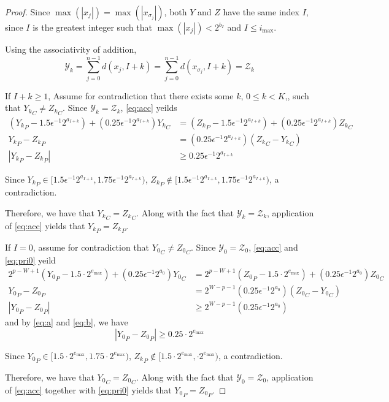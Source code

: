       \begin{proof}
        Since $\max(|x_j|) = \max(|x_{\sigma_j}|)$, both $Y$ and $Z$ have the same index $I$, since $I$ is the greatest integer such that $\max(|x_j|) < 2^{b_I}$ and $I \leq i_{\max}$.

        Using the associativity of addition,
        \begin{equation*}
          \mathcal{Y}_k = \sum\limits_{j = 0}^{n - 1}d(x_j, I + k) = \sum\limits_{j = 0}^{n - 1}d(x_{\sigma_j}, I + k) = \mathcal{Z}_k
        \end{equation*}

        If $I + k \geq 1$, Assume for contradiction that there exists some $k$, $0 \leq k < K$,, such that ${Y_k}_C \neq {Z_k}_C$. Since $\mathcal{Y}_k = \mathcal{Z}_k$, \eqref{eq:acc} yeilds
        \begin{align*}
          ({Y_k}_P - 1.5 \epsilon^{-1}2^{a_{I + k}}) + (0.25\epsilon^{-1}2^{a_{I + k}}){Y_k}_C &= ({Z_k}_P - 1.5 \epsilon^{-1}2^{a_{I + k}}) + (0.25\epsilon^{-1}2^{a_{I + k}}){Z_k}_C\\
          {Y_k}_P - {Z_k}_P &= (0.25\epsilon^{-1}2^{a_{I + k}})({Z_k}_C - {Y_k}_C)\\
          |{Y_k}_P - {Z_k}_P| &\geq 0.25\epsilon^{-1}2^{a_{I + k}}
        \end{align*}

        Since ${Y_k}_P \in [1.5  \epsilon^{-1} 2^{a_{I + k}}, 1.75  \epsilon^{-1} 2^{a_{I + k}})$, ${Z_k}_P \not\in [1.5  \epsilon^{-1} 2^{a_{I + k}}, 1.75  \epsilon^{-1} 2^{a_{I + k}})$, a contradiction.

        Therefore, we have that ${Y_k}_C = {Z_k}_C$. Along with the fact that $\mathcal{Y}_k = \mathcal{Z}_k$, application of \eqref{eq:acc} yields that ${Y_k}_P = {Z_k}_P$.

        If $I = 0$, assume for contradiction that ${Y_0}_C \neq {Z_0}_C$. Since $\mathcal{Y}_0 = \mathcal{Z}_0$, \eqref{eq:acc} and \eqref{eq:pri0} yeild
        \begin{align*}
          2^{p - W + 1}({Y_0}_P - 1.5\cdot2^{e_{\max}}) + (0.25\epsilon^{-1}2^{a_{0}}){Y_0}_C &= 2^{p - W + 1}({Z_0}_P - 1.5\cdot2^{e_{\max}}) + (0.25\epsilon^{-1}2^{a_{0}}){Z_0}_C\\
          {Y_0}_P - {Z_0}_P &= 2^{W - p - 1}(0.25\epsilon^{-1}2^{a_{0}})({Z_0}_C - {Y_0}_C)\\
          |{Y_0}_P - {Z_0}_P| &\geq 2^{W - p - 1}(0.25\epsilon^{-1}2^{a_{0}})
        \end{align*}
        and by \eqref{eq:a} and \eqref{eq:b}, we have
        \begin{equation*}
          |{Y_0}_P - {Z_0}_P| \geq 0.25\cdot2^{e_{\max}}
        \end{equation*}

        Since ${Y_0}_P \in [1.5  \cdot2^{e_{\max}}, 1.75  \cdot2^{e_{\max}})$, ${Z_k}_P \not\in [1.5  \cdot2^{e_{\max}}, \cdot2^{e_{\max}})$, a contradiction.

        Therefore, we have that ${Y_0}_C = {Z_0}_C$. Along with the fact that $\mathcal{Y}_0 = \mathcal{Z}_0$, application of \eqref{eq:acc} together with \eqref{eq:pri0} yields that ${Y_0}_P = {Z_0}_P$.
      \end{proof}

